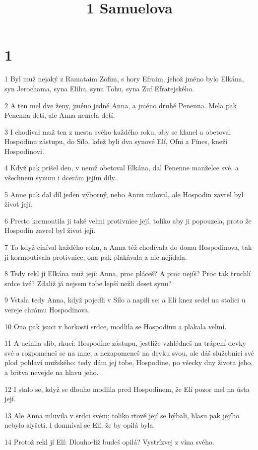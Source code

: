 

\title{1 Samuelova}

\chapter{1}

\par 1 Byl muž nejaký z Ramataim Zofim, s hory Efraim, jehož jméno bylo Elkána, syn Jerochama, syna Elihu, syna Tohu, syna Zuf Efratejského.
\par 2 A ten mel dve ženy, jméno jedné Anna, a jméno druhé Penenna. Mela pak Penenna deti, ale Anna nemela detí.
\par 3 I chodíval muž ten z mesta svého každého roku, aby se klanel a obetoval Hospodinu zástupu, do Sílo, kdež byli dva synové Elí, Ofni a Fínes, kneží Hospodinovi.
\par 4 Když pak prišel den, v nemž obetoval Elkána, dal Penenne manželce své, a všechnem synum i dcerám jejím díly.
\par 5 Anne pak dal díl jeden výborný, nebo Annu miloval, ale Hospodin zavrel byl život její.
\par 6 Presto kormoutila ji také velmi protivnice její, toliko aby ji popouzela, proto že Hospodin zavrel byl život její.
\par 7 To když ciníval každého roku, a Anna též chodívala do domu Hospodinova, tak ji kormoutívala protivnice; ona pak plakávala a nic nejídala.
\par 8 Tedy rekl jí Elkána muž její: Anna, proc pláceš? A proc nejíš? Proc tak truchlí srdce tvé? Zdaliž já nejsem tobe lepší nežli deset synu?
\par 9 Vstala tedy Anna, když pojedli v Sílo a napili se; a Elí knez sedel na stolici u vereje chrámu Hospodinova.
\par 10 Ona pak jsuci v horkosti srdce, modlila se Hospodinu a plakala velmi.
\par 11 A ucinila slib, rkuci: Hospodine zástupu, jestliže vzhlédneš na trápení devky své a rozpomeneš se na mne, a nezapomeneš na devku svou, ale dáš služebnici své plod pohlaví mužského: tedy dám jej tobe, Hospodine, po všecky dny života jeho, a britva nevejde na hlavu jeho.
\par 12 I stalo se, když se dlouho modlila pred Hospodinem, že Elí pozor mel na ústa její.
\par 13 Ale Anna mluvila v srdci svém; toliko rtové její se hýbali, hlasu pak jejího nebylo slyšeti. I domníval se Elí, že by opilá byla.
\par 14 Protož rekl jí Elí: Dlouho-liž budeš opilá? Vystrízvej z vína svého.
